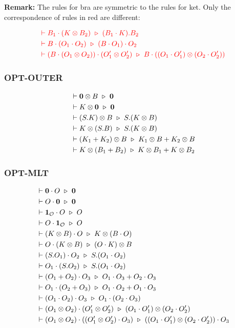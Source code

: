 \textbf{Remark: } The rules for bra are symmetric to the rules for ket. Only the correspondence of rules in red are different:

\begin{align*}
  & \textcolor{red}{\vdash B_1 \cdot (K \otimes B_2) \ \triangleright\  (B_1 \cdot K).B_2} \\
  & \textcolor{red}{\vdash B \cdot (O_1 \cdot O_2) \ \triangleright\  (B \cdot O_1) \cdot O_2} \\
  & \textcolor{red}{\vdash (B \cdot (O_1 \otimes O_2)) \cdot (O_1' \otimes O_2') \ \triangleright\  B \cdot ((O_1 \cdot O_1') \otimes (O_2 \cdot O_2'))}
\end{align*}

\subsubsection*{\textsf{OPT-OUTER}}
\begin{align*}
  & \vdash \mathbf{0} \otimes B \ \triangleright\  \mathbf{0} \\
  & \vdash K \otimes \mathbf{0} \ \triangleright\  \mathbf{0} \\
  & \vdash (S.K) \otimes B \ \triangleright\  S.(K \otimes B) \\
  & \vdash K \otimes (S.B) \ \triangleright\  S.(K \otimes B) \\
  & \vdash (K_1 + K_2) \otimes B \ \triangleright\  K_1 \otimes B + K_2 \otimes B \\
  & \vdash K \otimes (B_1 + B_2) \ \triangleright\  K \otimes B_1 + K \otimes B_2
\end{align*}

\subsubsection*{\textsf{OPT-MLT}}
\begin{align*}
  & \vdash \mathbf{0} \cdot O \ \triangleright\  \mathbf{0} \\
  & \vdash O \cdot \mathbf{0} \ \triangleright\  \mathbf{0} \\
  & \vdash \mathbf{1}_\mathcal{O} \cdot O \ \triangleright\  O \\
  & \vdash O \cdot \mathbf{1}_\mathcal{O} \ \triangleright\  O \\
  & \vdash (K \otimes B) \cdot O \ \triangleright\  K \otimes (B \cdot O)\\
  & \vdash O \cdot (K \otimes B) \ \triangleright\  (O \cdot K) \otimes B\\
  & \vdash (S.O_1) \cdot O_2 \ \triangleright\  S.(O_1 \cdot O_2) \\
  & \vdash O_1 \cdot (S.O_2) \ \triangleright\  S.(O_1 \cdot O_2) \\
  & \vdash (O_1 + O_2) \cdot O_3 \ \triangleright\  O_1 \cdot O_3 + O_2 \cdot O_3 \\
  & \vdash O_1 \cdot (O_2 + O_3) \ \triangleright\  O_1 \cdot O_2 + O_1 \cdot O_3 \\
  & \vdash (O_1 \cdot O_2) \cdot O_3 \ \triangleright\  O_1 \cdot (O_2 \cdot O_3) \\
  & \vdash (O_1 \otimes O_2) \cdot (O_1' \otimes O_2') \ \triangleright\  (O_1 \cdot O_1') \otimes (O_2 \cdot O_2') \\
  & \vdash (O_1 \otimes O_2) \cdot ((O_1' \otimes O_2') \cdot O_3) \ \triangleright\  ((O_1 \cdot O_1') \otimes (O_2 \cdot O_2')) \cdot O_3
\end{align*}


